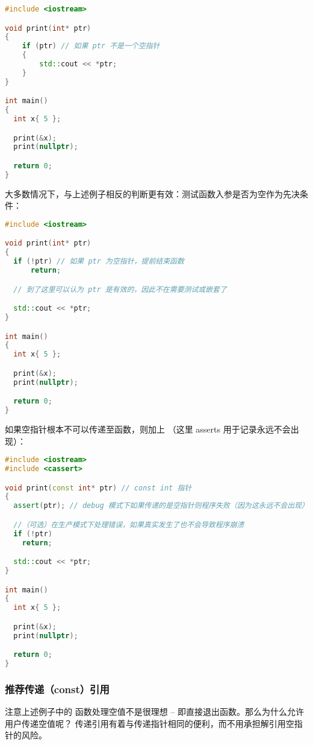 \documentclass[../../LearnCpp.tex]{subfiles}
\begin{document}
\begin{lstlisting}[language=C++]
#include <iostream>

void print(int* ptr)
{
    if (ptr) // 如果 ptr 不是一个空指针
    {
        std::cout << *ptr;
    }
}

int main()
{
  int x{ 5 };

  print(&x);
  print(nullptr);

  return 0;
}
\end{lstlisting}

大多数情况下，与上述例子相反的判断更有效：测试函数入参是否为空作为先决条件：

\begin{lstlisting}[language=C++]
#include <iostream>

void print(int* ptr)
{
  if (!ptr) // 如果 ptr 为空指针，提前结束函数
      return;

  // 到了这里可以认为 ptr 是有效的，因此不在需要测试或嵌套了

  std::cout << *ptr;
}

int main()
{
  int x{ 5 };

  print(&x);
  print(nullptr);

  return 0;
}
\end{lstlisting}

如果空指针根本不可以传递至函数，则加上 （这里 asserts 用于记录永远不会出现）：

\begin{lstlisting}[language=C++]
#include <iostream>
#include <cassert>

void print(const int* ptr) // const int 指针
{
  assert(ptr); // debug 模式下如果传递的是空指针则程序失败（因为这永远不会出现）

  //（可选）在生产模式下处理错误，如果真实发生了也不会导致程序崩溃
  if (!ptr)
    return;

  std::cout << *ptr;
}

int main()
{
  int x{ 5 };

  print(&x);
  print(nullptr);

  return 0;
}
\end{lstlisting}

\subsubsection*{推荐传递（const）引用}

注意上述例子中的  函数处理空值不是很理想 --
即直接退出函数。那么为什么允许用户传递空值呢？
传递引用有着与传递指针相同的便利，而不用承担解引用空指针的风险。
\end{document}
